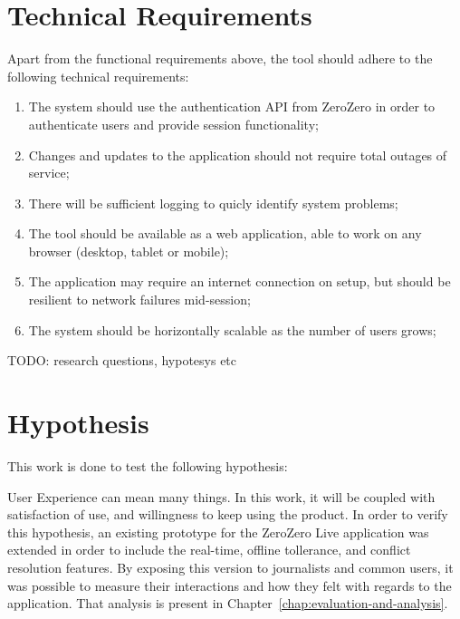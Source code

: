 \section{Technical Requirements}

Apart from the functional requirements above, the tool should adhere to the following technical requirements:

\begin{enumerate}[leftmargin  = 3.25\parindent, align=left, label=TR\arabic*, start=1]
    \item The system should use the authentication API from ZeroZero in order to authenticate users and provide session functionality;
    \item Changes and updates to the application should not require total outages of service;
    \item There will be sufficient logging to quicly identify system problems;
    \item The tool should be available as a web application, able to work on any browser (desktop, tablet or mobile);
    \item The application may require an internet connection on setup, but should be resilient to network failures mid-session;
    \item The system should be horizontally scalable as the number of users grows;
\end{enumerate}

{\Huge TODO: research questions, hypotesys etc}

\section{Hypothesis}

This work is done to test the following hypothesis:

\begin{quote}
\end{quote}

User Experience can mean many things. In this work, it will be coupled with satisfaction of use, and willingness to keep using the product. In order to verify this hypothesis, an existing prototype for the ZeroZero Live application was extended in order to include the real-time, offline tollerance, and conflict resolution features. By exposing this version to journalists and common users, it was possible to measure their interactions and how they felt with regards to the application. That analysis is present in Chapter~\ref{chap:evaluation-and-analysis}.

